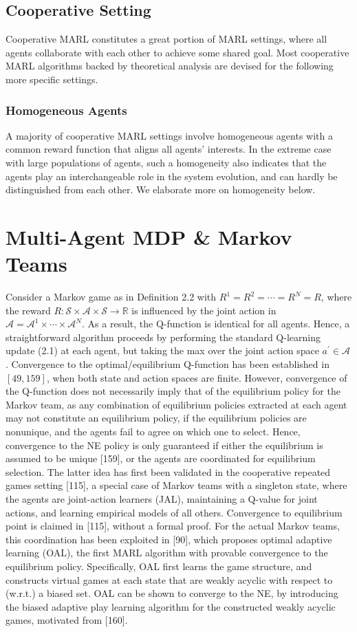 \documentclass[10pt]{article}
\begin{document}
\subsection{Cooperative Setting}
Cooperative MARL constitutes a great portion of MARL settings, where all agents collaborate with each other to achieve some shared goal. Most cooperative MARL algorithms backed by theoretical analysis are devised for the following more specific settings.

\subsubsection{Homogeneous Agents}
A majority of cooperative MARL settings involve homogeneous agents with a common reward function that aligns all agents' interests. In the extreme case with large populations of agents, such a homogeneity also indicates that the agents play an interchangeable role in the system evolution, and can hardly be distinguished from each other. We elaborate more on homogeneity below.

\section{Multi-Agent MDP \& Markov Teams}
Consider a Markov game as in Definition 2.2 with $R^{1}=R^{2}=\cdots=R^{N}=R$, where the reward $R: \mathcal{S} \times \mathcal{A} \times \mathcal{S} \rightarrow \mathbb{R}$ is influenced by the joint action in $\mathcal{A}=\mathcal{A}^{1} \times \cdots \times \mathcal{A}^{N}$. As a result, the $\mathrm{Q}$-function is identical for all agents. Hence, a straightforward algorithm proceeds by performing the standard Q-learning update (2.1) at each agent, but taking the max over the joint action space $a^{\prime} \in \mathcal{A}$. Convergence to the optimal/equilibrium $\mathrm{Q}$-function has been established in $[49,159]$, when both state and action spaces are finite. However, convergence of the Q-function does not necessarily imply that of the equilibrium policy for the Markov team, as any combination of equilibrium policies extracted at each agent may not constitute an equilibrium policy, if the equilibrium policies are nonunique, and the agents fail to agree on which one to select. Hence, convergence to the NE policy is only guaranteed if either the equilibrium is assumed to be unique [159], or the agents are coordinated for equilibrium selection. The latter idea has first been validated in the cooperative repeated games setting [115], a special case of Markov teams with a singleton state, where the agents are joint-action learners (JAL), maintaining a Q-value for joint actions, and learning empirical models of all others. Convergence to equilibrium point is claimed in [115], without a formal proof. For the actual Markov teams, this coordination has been exploited in [90], which proposes optimal adaptive learning (OAL), the first MARL algorithm with provable convergence to the equilibrium policy. Specifically, OAL first learns the game structure, and constructs virtual games at each state that are weakly acyclic with respect to (w.r.t.) a biased set. OAL can be shown to converge to the NE, by introducing the biased adaptive play learning algorithm for the constructed weakly acyclic games, motivated from [160].
\end{document}
